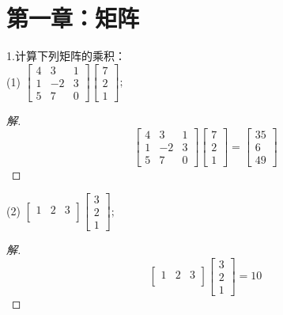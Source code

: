 \documentclass[10pt,a4paper]{report}
\title{}
\author{}
\date{}
\begin{document}
\chapter*{第一章：矩阵}

\noindent 1.计算下列矩阵的乘积：\\
\noindent (1)
$
\left[
\begin{matrix}
4 & 3 & 1 \\
1 & -2 & 3 \\
5 & 7 & 0
\end{matrix}
\right] 
\left[
\begin{matrix}
7 \\
2 \\
1
\end{matrix}
\right]; 
$

\begin{proof}[解]
	$$
	\left[
	\begin{matrix}
	4 & 3 & 1 \\
	1 & -2 & 3 \\
	5 & 7 & 0
	\end{matrix}
	\right] 
	\left[
	\begin{matrix}
	7 \\
	2 \\
	1
	\end{matrix}
	\right]=\left[
	\begin{matrix}
	35 \\
	6 \\
	49
	\end{matrix}
	\right]
	$$
\end{proof}

\noindent (2)
$
\left[
\begin{matrix}
1 & 2 & 3 \\
\end{matrix}
\right] 
\left[
\begin{matrix}
3 \\
2 \\
1
\end{matrix}
\right]; 
$

\begin{proof}[解]
	$$
	\left[
	\begin{matrix}
	1 & 2 & 3 \\
	\end{matrix}
	\right] 
	\left[
	\begin{matrix}
	3 \\
	2 \\
	1
	\end{matrix}
	\right]=10
	$$
\end{proof}
\end{document}
